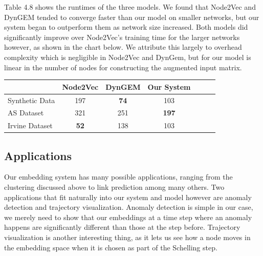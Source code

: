 \documentclass[12pt,twoside]{report}
\begin{document}
Table 4.8 shows the runtimes of the three models. We found that Node2Vec and DynGEM tended to converge faster than our model on smaller networks, but our system began to outperform them as network size increased. Both models did significantly improve over Node2Vec's training time for the larger networks however, as shown in the chart below. We attribute this largely to overhead complexity which is negligible in Node2Vec and DynGem, but for our model is linear in the number of nodes for constructing the augmented input matrix. \\

\begin{center}
\begin{tabular}{l*{5}{c}r}
              & Node2Vec & DynGEM & Our System \\
\hline
Synthetic Data    & 197 & \textbf{74} & 103  \\
AS Dataset   & 321 & 251 & \textbf{197}  \\
Irvine Dataset   & \textbf{52} & 138 & 103  \\
\end{tabular}
\end{center} 

\subsection{Applications}

Our embedding system has many possible applications, ranging from the clustering discussed above to link prediction among many others. Two applications that fit naturally into our system and model however are anomaly detection and trajectory visualization. Anomaly detection is simple in our case, we merely need to show that our embeddings at a time step where an anomaly happens are significantly different than those at the step before. Trajectory visualization is another interesting thing, as it lets us see how a node moves in the embedding space when it is chosen as part of the Schelling step. \\
\end{document}
